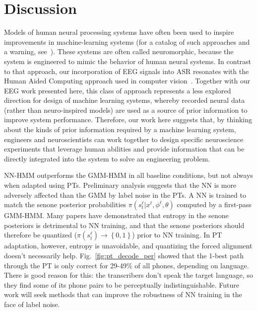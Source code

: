 \section{Discussion}

Models of human neural processing systems have often been used to
inspire improvements in machine-learning systems (for a catalog of
such approaches and a warning, see~\cite{Bourlard96}).  These systems
are often called neuromorphic, because the system is engineered to
mimic the behavior of human neural systems. In contrast to that
approach, our incorporation of EEG signals into ASR resonates with the
Human Aided Computing approach used in computer
vision~\cite{Shenoy08,Wang09}. Together with our EEG work presented
here, this class of approach represents a less explored direction for
design of machine learning systems, whereby recorded neural data
(rather than neuro-inspired models) are used as a source of prior
information to improve system performance. Therefore, our work here
suggests that, by thinking about the kinds of prior information
required by a machine learning system, engineers and neuroscientists
can work together to design specific neuroscience experiments that
leverage human abilities and provide information that can be directly
integrated into the system to solve an engineering problem.

NN-HMM outperforms the GMM-HMM in all baseline conditions, but not always
when adapted using PTs.  Preliminary analysis suggests that the NN is
more adversely affected than the GMM by label noise in the PTs.  A NN
is trained to match the senone posterior probabilities
$\pi(s_t^\ell|x^\ell,\phi^\ell,\theta)$ computed by a first-pass
GMM-HMM.  Many papers have demonstrated that entropy in the senone
posteriors is detrimental to NN training, and that the senone
posteriors should therefore be quantized
($\pi(s_t^\ell)\rightarrow\left\{0,1\right\}$) prior to NN training.
In PT adaptation, however, entropy is unavoidable, and quantizing the
forced alignment doesn't necessarily help.  Fig.~\ref{fig:pt_decode_per}
showed that the 1-best path through the PT is only correct for 29-49\%
of all phones, depending on language.  There is good reason for this:
the transcribers don't speak the target language, so they find some of
its phone pairs to be perceptually indistinguishable.  Future work
will seek methods that can improve the robustness of NN training in
the face of label noise.  

